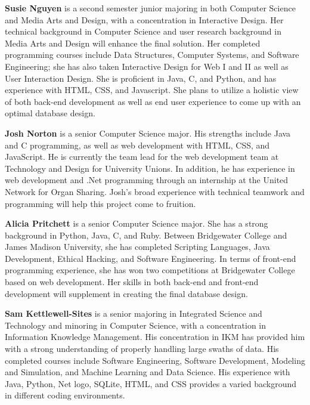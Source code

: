 \documentclass[11pt]{article}
\begin{document}
\hspace{\parindent}\textbf{Susie Nguyen} is a second semester junior majoring in both Computer Science and Media Arts and Design, with a concentration in Interactive Design. Her technical background in Computer Science and user research background in Media Arts and Design will enhance the final solution. Her completed programming courses include Data Structures, Computer Systems, and Software Engineering; she has also taken Interactive Design for Web I and II as well as User Interaction Design. She is proficient in Java, C, and Python, and has experience with HTML, CSS, and Javascript. She plans to utilize a holistic view of both back-end development as well as end user experience to come up with an optimal database design. 

 
\textbf{Josh Norton} is a senior Computer Science major.  His strengths include Java and C programming, as well as web development with HTML, CSS, and JavaScript.  He is currently the team lead for the web development team at Technology and Design for University Unions.  In addition, he has experience in web development and .Net programming through an internship at the United Network for Organ Sharing. Josh's broad experience with technical teamwork and programming will help this project come to fruition.


\textbf{Alicia Pritchett} is a senior Computer Science major. She has a strong background in Python, Java, C, and Ruby. Between Bridgewater College and James Madison University, she has completed Scripting Languages, Java Development, Ethical Hacking, and Software Engineering. In terms of front-end programming experience, she has won two competitions at Bridgewater College based on web development. Her skills in both back-end and front-end development will supplement in creating the final database design.


\textbf{Sam Kettlewell-Sites} is a senior majoring in Integrated Science and Technology and minoring in Computer Science, with a concentration in Information Knowledge Management. His concentration in IKM has provided him with a strong understanding of properly handling large swaths of data. His completed courses include Software Engineering, Software Development, Modeling and Simulation, and Machine Learning and Data Science. His experience with Java, Python, Net logo, SQLite, HTML, and CSS provides a varied background in different coding environments.



\end{document}
